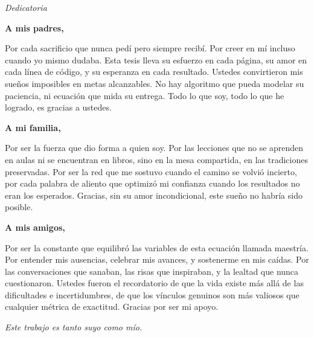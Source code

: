 
\thispagestyle{empty}
\vspace*{\fill}

\begin{center}
\Large\textit{Dedicatoria}
\end{center}

\vspace{1cm}

\noindent
\textbf{A mis padres,}

\noindent
Por cada sacrificio que nunca pedí pero siempre recibí. Por creer en mí incluso cuando yo mismo dudaba. Esta tesis lleva su esfuerzo en cada página, su amor en cada línea de código, y su esperanza en cada resultado. Ustedes convirtieron mis sueños imposibles en metas alcanzables. No hay algoritmo que pueda modelar su paciencia, ni ecuación que mida su entrega. Todo lo que soy, todo lo que he logrado, es gracias a ustedes.

\vspace{0.8cm}

\noindent
\textbf{A mi familia,}

\noindent
Por ser la fuerza que dio forma a quien soy. Por las lecciones que no se aprenden en aulas ni se encuentran en libros, sino en la mesa compartida, en las tradiciones preservadas. Por ser la red que me sostuvo cuando el camino se volvió incierto, por cada palabra de aliento que optimizó mi confianza cuando los resultados no eran los esperados. Gracias, sin su amor incondicional, este sueño no habría sido posible.
\vspace{0.8cm}

\noindent
\textbf{A mis amigos,}

\noindent
Por ser la constante que equilibró las variables de esta ecuación llamada maestría. Por entender mis ausencias, celebrar mis avances, y sostenerme en mis caídas. Por las conversaciones que sanaban, las risas que inspiraban, y la lealtad que nunca cuestionaron. Ustedes fueron el recordatorio de que la vida existe más allá de las dificultades e incertidumbres, de que los vínculos genuinos son más valiosos que cualquier métrica de exactitud. Gracias por ser mi apoyo.

\vspace{1cm}

\begin{center}
\textit{Este trabajo es tanto suyo como mío.}
\end{center}

\vspace*{\fill}
